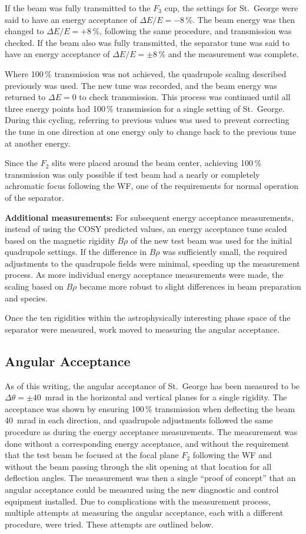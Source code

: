 If the beam was fully transmitted to the $F_3$ cup, the settings for
St.\ George were said to have an energy acceptance of $\Delta E/E =
-8$\,\%. The beam energy was then changed to $\Delta E/E = + 8$\,\%,
following the same procedure, and transmission was checked. If the beam
also was fully transmitted, the separator tune was said to have an
energy acceptance of $\Delta E/E = \pm 8$\,\% and the measurement was
complete.

Where 100\,\% transmission was not achieved, the quadrupole scaling
described previously was used. The new tune was recorded, and the beam
energy was returned to $\Delta E = 0$ to check transmission. This
process was continued until all three energy points had 100\,\%
transmission for a single setting of St.\ George. During this cycling,
referring to previous values was used to prevent correcting the tune in
one direction at one energy only to change back to the previous tune at
another energy.

Since the $F_2$ slits were placed around the beam center, achieving
100\,\% transmission was only possible if test beam had a nearly or
completely achromatic focus following the WF, one of the requirements
for normal operation of the separator.

\textbf{Additional measurements:}
For subsequent energy acceptance measurements, instead of using the COSY
predicted values, an energy acceptance tune scaled based on the magnetic
rigidity $B\rho$ of the new test beam was used for the initial
quadrupole settings. If the difference in $B\rho$ was sufficiently
small, the required adjustments to the quadrupole fields were minimal,
speeding up the measurement process. As more individual energy
acceptance measurements were made, the scaling based on $B\rho$ became
more robust to slight differences in beam preparation and species.

Once the ten rigidities within the astrophysically interesting phase
space of the separator were measured, work moved to measuring the
angular acceptance.


\subsection{Angular Acceptance}

As of this writing, the angular acceptance of St.\ George has been
measured to be $\Delta\theta = \pm 40$~mrad in the horizontal and
vertical planes for a single rigidity. The acceptance was shown by
ensuring 100\,\% transmission when deflecting the beam 40~mrad in each
direction, and quadrupole adjustments followed the same procedure as
during the energy acceptance measurements. The measurement was done
without a corresponding energy acceptance, and without the requirement
that the test beam be focused at the focal plane $F_2$ following the WF
and without the beam passing through the slit opening at that location
for all deflection angles. The measurement was then a single ``proof of
concept'' that an angular acceptance could be measured using the new
diagnostic and control equipment installed. Due to complications with
the measurement process, multiple attempts at measuring the angular
acceptance, each with a different procedure, were tried. These attempts
are outlined below.


